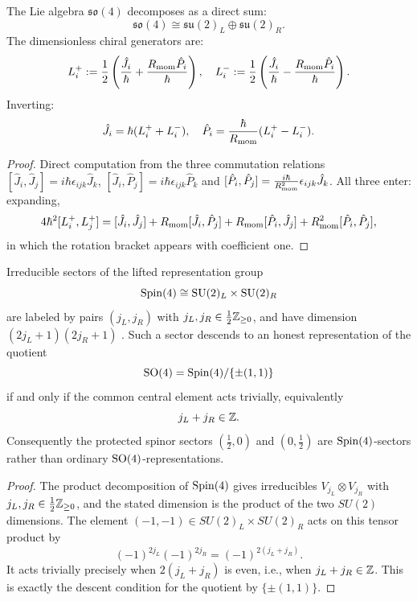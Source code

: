 \documentclass[12pt,a4paper]{article}
\begin{document}
\begin{proposition}
\label{p2:prop:chiral}
The Lie algebra $\mathfrak{so}(4)$ decomposes as a direct sum:
\begin{equation}
\mathfrak{so}(4) \cong \mathfrak{su}(2)_L \oplus \mathfrak{su}(2)_R.
\end{equation}
The dimensionless chiral generators are:
\begin{equation}
L^+_i := \frac{1}{2}\left(\frac{\hat{J}_i}{\hbar} + \frac{R_{\mathrm{mom}}\hat{P}_i}{\hbar}\right), \quad 
L^-_i := \frac{1}{2}\left(\frac{\hat{J}_i}{\hbar} - \frac{R_{\mathrm{mom}}\hat{P}_i}{\hbar}\right).
\end{equation}
Inverting:
\begin{equation}
\hat{J}_i = \hbar(L^+_i + L^-_i), \quad \hat{P}_i = \frac{\hbar}{R_{\mathrm{mom}}}(L^+_i - L^-_i).
\end{equation}
\end{proposition}

\begin{proof}
Direct computation from the three commutation relations
\(
[\hat{J}_i,\hat{J}_j]=i\hbar\epsilon_{ijk}\hat{J}_k
\),
\(
[\hat{J}_i,\hat{P}_j]=i\hbar\epsilon_{ijk}\hat{P}_k
\)
and
\(
[\hat{P}_i,\hat{P}_j]
=\frac{i\hbar}{R_{\mathrm{mom}}^2}\epsilon_{ijk}\hat{J}_k
\).
All three enter: expanding,
\[
 4\hbar^{2}[L^{+}_i,L^{+}_j]
 =[\hat J_i,\hat J_j]
 +R_{\mathrm{mom}}[\hat J_i,\hat P_j]
 +R_{\mathrm{mom}}[\hat P_i,\hat J_j]
 +R_{\mathrm{mom}}^{2}[\hat P_i,\hat P_j],
\]
in which the rotation bracket appears with coefficient one.
\end{proof}

\begin{corollary}
\label{p2:cor:spin4-labels-so4-descent}
Irreducible sectors of the lifted representation group
\[
\mathrm{Spin}(4)\cong \mathrm{SU}(2)_L\times \mathrm{SU}(2)_R
\]
are labeled by pairs $(j_L,j_R)$ with $j_L,j_R\in\frac12\mathbb{Z}_{\ge0}$, and have dimension $(2j_L+1)(2j_R+1)$ \cite{fulton1991representation,Hall2015lie}.  Such a sector descends to an honest representation of the quotient
\[
\mathrm{SO}(4)=\mathrm{Spin}(4)/\{\pm(1,1)\}
\]
if and only if the common central element acts trivially, equivalently
\[
j_L+j_R\in\mathbb{Z}.
\]
Consequently the protected spinor sectors $(\tfrac12,0)$ and $(0,\tfrac12)$ are \(\mathrm{Spin}(4)\)-sectors rather than ordinary \(\mathrm{SO}(4)\)-representations.
\end{corollary}

\begin{proof}
The product decomposition of \(\mathrm{Spin}(4)\) gives irreducibles
$V_{j_L}\otimes V_{j_R}$ with $j_L,j_R\in \frac12\mathbb{Z}_{\ge0}$, and the stated dimension is the product of the two \(SU(2)\) dimensions.  The element $(-1,-1)\in SU(2)_L\times SU(2)_R$ acts on this tensor product by
\[
(-1)^{2j_L}(-1)^{2j_R}=(-1)^{2(j_L+j_R)}.
\]
It acts trivially precisely when $2(j_L+j_R)$ is even, i.e., when $j_L+j_R\in\mathbb{Z}$.  This is exactly the descent condition for the quotient by \(\{\pm(1,1)\}\).
\end{proof}
\end{document}

